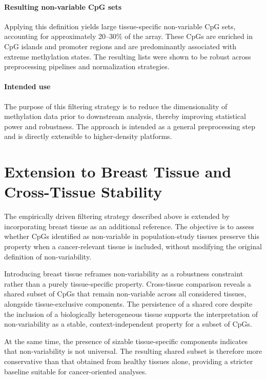 \documentclass[10pt]{extarticle}
\begin{document}
\paragraph{Resulting non-variable CpG sets}
Applying this definition yields large tissue-specific non-variable CpG sets, accounting for approximately 20--30\% of the array. These CpGs are enriched in CpG islands and promoter regions and are predominantly associated with extreme methylation states. The resulting lists were shown to be robust across preprocessing pipelines and normalization strategies.

\paragraph{Intended use}
The purpose of this filtering strategy is to reduce the dimensionality of methylation data prior to downstream analysis, thereby improving statistical power and robustness. The approach is intended as a general preprocessing step and is directly extensible to higher-density platforms.

\section{Extension to Breast Tissue and Cross-Tissue Stability}

The empirically driven filtering strategy described above is extended by incorporating breast tissue as an additional reference. The objective is to assess whether CpGs identified as non-variable in population-study tissues preserve this property when a cancer-relevant tissue is included, without modifying the original definition of non-variability.

Introducing breast tissue reframes non-variability as a robustness constraint rather than a purely tissue-specific property. Cross-tissue comparison reveals a shared subset of CpGs that remain non-variable across all considered tissues, alongside tissue-exclusive components. The persistence of a shared core despite the inclusion of a biologically heterogeneous tissue supports the interpretation of non-variability as a stable, context-independent property for a subset of CpGs.

At the same time, the presence of sizable tissue-specific components indicates that non-variability is not universal. The resulting shared subset is therefore more conservative than that obtained from healthy tissues alone, providing a stricter baseline suitable for cancer-oriented analyses.
\end{document}
